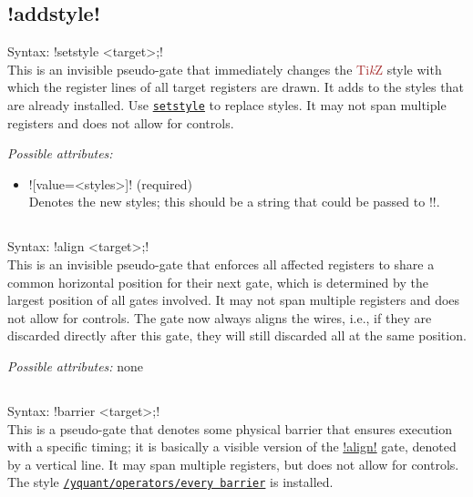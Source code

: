 \documentclass{scrartcl}
\def\TikZ{\textcolor{brown}{Ti\textit kZ}}
\def\gate#1{\hyperref[gate:#1]{\texttt{#1}}}
\def\style#1{\hyperref[style:#1]{\texttt{#1}}}
\begin{document}
      \subsection[\texorpdfstring{\yquant{addstyle}}{addstyle}]{\yquant!addstyle!}\label{gate:addstyle}
         Syntax: \yquant!setstyle <target>;! \\
         This is an invisible pseudo\hyp gate that immediately changes the \TikZ{} style with which the register lines of all target registers are drawn.
         It adds to the styles that are already installed.
         Use \gate{setstyle} to replace styles.
         It may not span multiple registers and does not allow for controls.

         \emph{Possible attributes:}
         \begin{itemize}
            \item \yquant![value=<styles>]! (required) \\
               Denotes the new styles; this should be a string that could be passed to \tex!\tikzset!.
         \end{itemize}

      \subsection{\texorpdfstring{}{align}}\label{gate:align}
         Syntax: \yquant!align <target>;! \\
         This is an invisible pseudo\hyp gate that enforces all affected registers to share a common horizontal position for their next gate, which is determined by the largest position of all gates involved.
         It may not span multiple registers and does not allow for controls.
         The gate now always aligns the wires, i.e., if they are discarded directly after this gate, they will still discarded all at the same position.

         \emph{Possible attributes:} none

      \subsection{\texorpdfstring{}{barrier}}\label{gate:barrier}
         Syntax: \yquant!barrier <target>;! \\
         This is a pseudo\hyp gate that denotes some physical barrier that ensures execution with a specific timing; it is basically a visible version of the \hyperref[gate:align]{\yquant!align!} gate, denoted by a vertical line.
         It may span multiple registers, but does not allow for controls.
         The style \style{/yquant/operators/every barrier} is installed.
\end{document}
